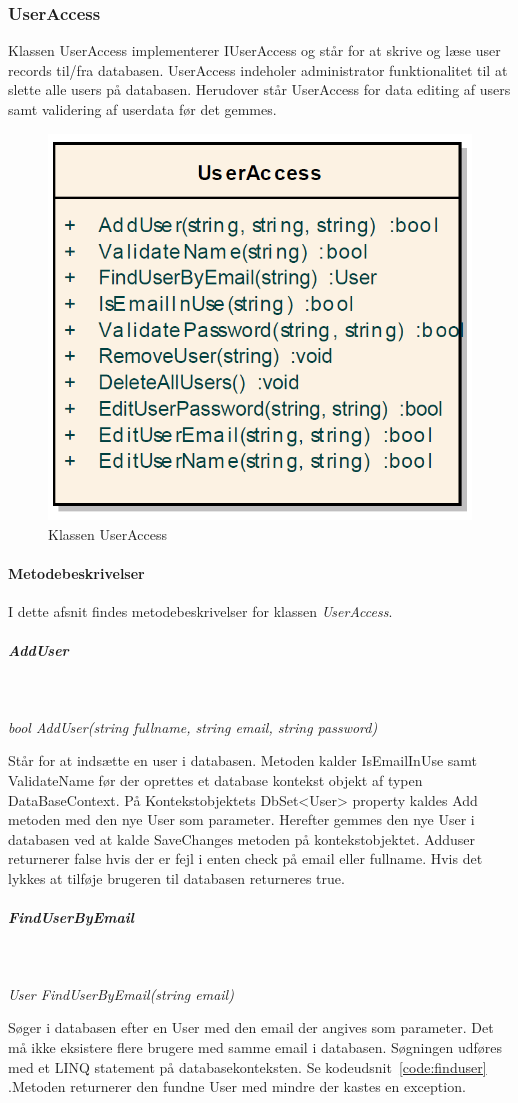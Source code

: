 \subsubsection{UserAccess}
Klassen UserAccess implementerer IUserAccess og står for at skrive og læse user records til/fra databasen.
UserAccess indeholer administrator funktionalitet til at slette alle users på databasen. Herudover står UserAccess for data editing af users samt validering af userdata før det gemmes.

\begin{figure}
\centering
\includegraphics[width=0.4\linewidth]{figs/implementering/UserAccessClass.PNG}
\caption{Klassen UserAccess}
\label{fig:UserAccessClass}
\end{figure}


\paragraph{Metodebeskrivelser}
I dette afsnit findes metodebeskrivelser for klassen \textit{UserAccess}.

\subparagraph{AddUser}\

\textit{bool AddUser(string fullname, string email, string password)}

Står for at indsætte en user i databasen. Metoden kalder IsEmailInUse samt ValidateName før der oprettes et database kontekst objekt af typen DataBaseContext. På Kontekstobjektets DbSet<User> property kaldes Add metoden med den nye User som parameter. Herefter gemmes den nye User i databasen ved at kalde SaveChanges metoden på kontekstobjektet. Adduser returnerer false hvis der er fejl i enten check på email eller fullname. Hvis det lykkes at tilføje brugeren til databasen returneres true.

\subparagraph{FindUserByEmail}\

\textit{User FindUserByEmail(string email)}

Søger i databasen efter en User med den email der angives som parameter. Det må ikke eksistere flere brugere med samme email i databasen. Søgningen udføres med et LINQ statement på databasekonteksten. Se kodeudsnit~\ref{code:finduser} .Metoden returnerer den fundne User med mindre der kastes en exception.

